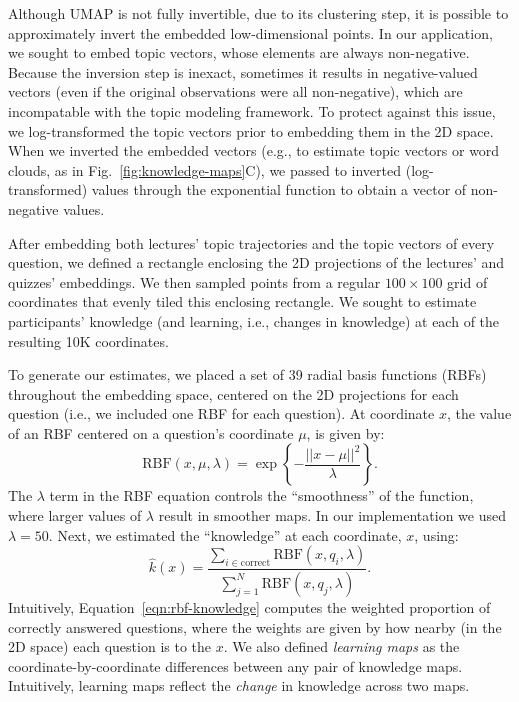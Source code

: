 \documentclass[10pt]{article}
\begin{document}
Although UMAP is not fully invertible, due to its clustering step, it is
possible to approximately invert the embedded low-dimensional points. In our
application, we sought to embed topic vectors, whose elements are always
non-negative. Because the inversion step is inexact, sometimes it results in
negative-valued vectors (even if the original observations were all
non-negative), which are incompatable with the topic modeling framework. To
protect against this issue, we log-transformed the topic vectors prior to
embedding them in the 2D space. When we inverted the embedded vectors (e.g., to
estimate topic vectors or word clouds, as in Fig.~\ref{fig:knowledge-maps}C),
we passed to inverted (log-transformed) values through the exponential function
to obtain a vector of non-negative values.

After embedding both lectures' topic trajectories and the topic vectors of
every question, we defined a rectangle enclosing the 2D projections of the
lectures' and quizzes' embeddings. We then sampled points from a regular $100
\times 100$ grid of coordinates that evenly tiled this enclosing rectangle. We
sought to estimate participants' knowledge (and learning, i.e., changes in
knowledge) at each of the resulting 10K coordinates.

To generate our estimates, we placed a set of 39 radial basis functions (RBFs)
throughout the embedding space, centered on the 2D projections for each
question (i.e., we included one RBF for each question). At coordinate $x$, the
value of an RBF centered on a question's coordinate $\mu$, is given by:
\begin{equation}
    \mathrm{RBF}(x, \mu, \lambda) = \exp\left\{-\frac{||x - \mu||^2}{\lambda}\right\}.
    \label{eqn:rbf}
\end{equation}
The $\lambda$ term in the RBF equation controls the ``smoothness'' of the
function, where larger values of $\lambda$ result in smoother maps. In our
implementation we used $\lambda = 50$.  Next, we estimated the ``knowledge''
at each coordinate, $x$, using:
\begin{equation}
    \hat{k}(x) = \frac{\sum_{i \in \mathrm{correct}} \mathrm{RBF}(x, q_i, \lambda)}{\sum_{j = 1}^N \mathrm{RBF}(x, q_j, \lambda)}.
    \label{eqn:rbf-knowledge}
\end{equation}
Intuitively, Equation~\ref{eqn:rbf-knowledge} computes the weighted proportion of
correctly answered questions, where the weights are given by how nearby (in the 2D space)
each question is to the $x$.  We also defined \textit{learning maps} as the coordinate-by-coordinate
differences between any pair of knowledge maps.  Intuitively, learning maps reflect the \textit{change}
in knowledge across two maps.
\end{document}

